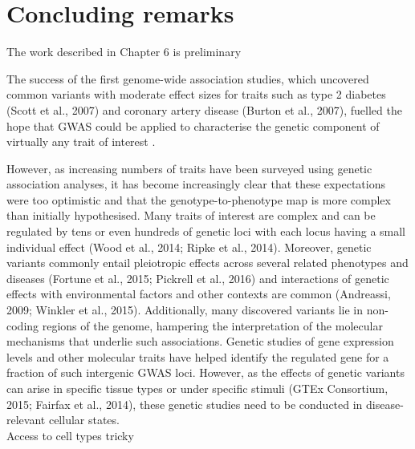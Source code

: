 
\chapter{Concluding remarks}  %
\label{chapter7}

The work described in Chapter 6 is preliminary

The success of the first genome-wide association studies, which uncovered common variants with moderate effect sizes for traits such as type 2 diabetes (Scott et al., 2007) and coronary artery disease (Burton et al., 2007), fuelled the hope that GWAS could be applied to characterise the genetic component of virtually any trait of interest \cite{visscher2012five}. 

However, as increasing numbers of traits have been surveyed using genetic association analyses, it has become increasingly clear that these expectations were too optimistic and that the genotype-to-phenotype map is more complex than initially hypothesised. 
Many traits of interest are complex and can be regulated by tens or even hundreds of genetic loci with each locus having a small individual effect (Wood et al., 2014; Ripke et al., 2014). 
Moreover, genetic variants commonly entail pleiotropic effects across several related phenotypes and diseases (Fortune et al., 2015; Pickrell et al., 2016) and interactions of genetic effects with environmental factors and other contexts are common (Andreassi, 2009; Winkler et al., 2015). 
Additionally, many discovered variants lie in non-coding regions of the genome, hampering the interpretation of the molecular mechanisms that underlie such associations. 
Genetic studies of gene expression levels and other molecular traits have helped identify the regulated gene for a fraction of such intergenic GWAS loci. 
However, as the effects of genetic variants can arise in specific tissue types or under specific stimuli (GTEx Consortium, 2015; Fairfax et al., 2014), these genetic studies need to be conducted in disease-relevant cellular states. \\


Access to cell types tricky

